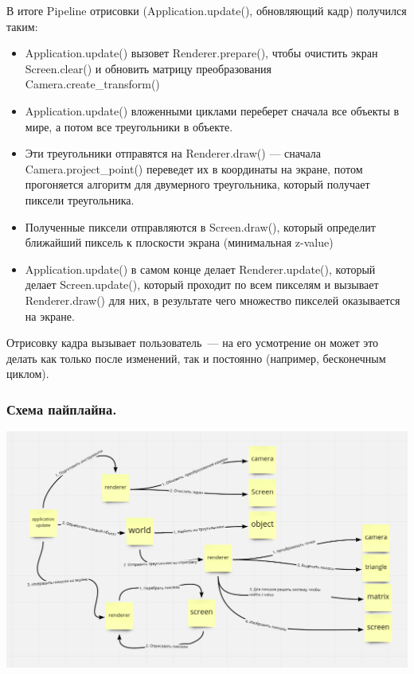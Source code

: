 \documentclass{article}
\begin{document}
В итоге Pipeline отрисовки (Application.update(), обновляющий кадр) получился таким:

\begin{itemize}

\item Application.update() вызовет Renderer.prepare(), чтобы очистить экран Screen.clear() и обновить матрицу преобразования Camera.create\_transform()
\item Application.update() вложенными циклами переберет сначала все объекты в мире, а потом все треугольники в объекте.
\item Эти треугольники отправятся на Renderer.draw() --- сначала Camera.project\_point() переведет их в координаты на экране, потом прогоняется алгоритм для двумерного треугольника, который получает пиксели треугольника.
\item Полученные пиксели отправляются в Screen.draw(), который определит ближайший пиксель к плоскости экрана (минимальная z-value)
\item Application.update() в самом конце делает Renderer.update(), который делает Screen.update(), который проходит по всем пикселям и вызывает Renderer.draw() для них, в результате чего множество пикселей оказывается на экране.
\end{itemize}

Отрисовку кадра вызывает пользователь~--- на его усмотрение он может это делать как только после изменений, так и постоянно (например, бесконечным циклом).

\subsubsection{Схема пайплайна.}

\begin{center}
\includegraphics[width=15cm]{scheme_pipeline.png}
\end{center}
\end{document}
